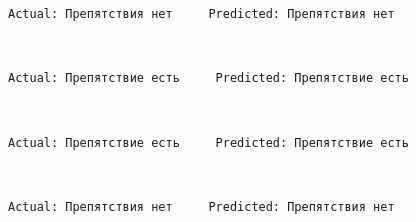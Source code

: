 \documentclass[11pt]{article}
\begin{document}
    \begin{Verbatim}[commandchars=\\\{\}]
Actual: Препятствия нет     Predicted: Препятствия нет

    \end{Verbatim}

    \begin{center}
    \end{center}
    { \hspace*{\fill} \\}
    
    \begin{Verbatim}[commandchars=\\\{\}]
Actual: Препятствие есть     Predicted: Препятствие есть

    \end{Verbatim}

    \begin{center}
    \end{center}
    { \hspace*{\fill} \\}
    
    \begin{Verbatim}[commandchars=\\\{\}]
Actual: Препятствие есть     Predicted: Препятствие есть

    \end{Verbatim}

    \begin{center}
    \end{center}
    { \hspace*{\fill} \\}
    
    \begin{Verbatim}[commandchars=\\\{\}]
Actual: Препятствия нет     Predicted: Препятствия нет

    \end{Verbatim}

    \begin{center}
    \end{center}
    { \hspace*{\fill} \\}
    
\end{document}
